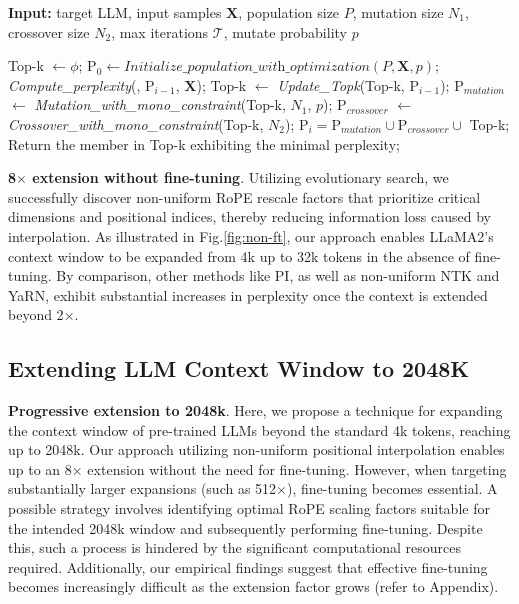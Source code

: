 \begin{algorithm}[t]
	\small
	\caption{The search algorithm}
	\textbf{Input:} target LLM, input samples $\mathbf{X}$,   population size $P$, mutation size $N_1$, crossover size $N_2$, max iterations $\mathcal{T}$, mutate probability $p$\\

	\begin{algorithmic}[1]
		\label{alg:search}
		\STATE Top-k $\leftarrow \phi$;	
		\STATE $\text{P}_0 \leftarrow \textit{Initialize\_population\_with\_optimization}(P, \mathbf{X}, p)$; 
		\STATE \textit{Compute\_perplexity}(, $\text{P}_{i-1}$, $\mathbf{X}$);
		\STATE  Top-k $\leftarrow$ \textit{Update\_Topk}(Top-k, $\text{P}_{i-1}$);
		\STATE $\text{P}_{mutation}$ $\leftarrow$ \textit{Mutation\_with\_mono\_constraint}(Top-k, $N_1$, $p$); 
		\STATE $\text{P}_{crossover}$ $\leftarrow$ \textit{Crossover\_with\_mono\_constraint}(Top-k, $N_2$);
		\STATE $\text{P}_i = \text{P}_{mutation} \cup \text{P}_{crossover} \cup $ Top-k;
		\ENDFOR
		\STATE Return the member in Top-k exhibiting the minimal perplexity;
	\end{algorithmic}
\end{algorithm}

\textbf{8$\times$ extension without fine-tuning}. Utilizing evolutionary search, we successfully discover non-uniform RoPE rescale factors that prioritize critical dimensions and positional indices, thereby reducing information loss caused by interpolation. As illustrated in Fig.\ref{fig:non-ft}, our approach enables LLaMA2’s context window to be expanded from 4k up to 32k tokens in the absence of fine-tuning. By comparison, other methods like PI, as well as non-uniform NTK and YaRN, exhibit substantial increases in perplexity once the context is extended beyond 2$\times$.

\subsection{Extending LLM Context Window to 2048K}
\label{sec:extendto2048k}

\textbf{Progressive extension to 2048k}. Here, we propose a technique for expanding the context window of pre-trained LLMs beyond the standard 4k tokens, reaching up to 2048k. Our approach utilizing non-uniform positional interpolation enables up to an 8$\times$ extension without the need for fine-tuning. However, when targeting substantially larger expansions (such as 512$\times$), fine-tuning becomes essential. A possible strategy involves identifying optimal RoPE scaling factors suitable for the intended 2048k window and subsequently performing fine-tuning. Despite this, such a process is hindered by the significant computational resources required. Additionally, our empirical findings suggest that effective fine-tuning becomes increasingly difficult as the extension factor grows (refer to Appendix).

